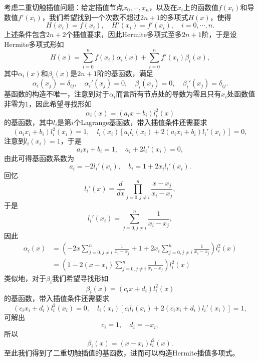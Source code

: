 \documentclass[a4paper,10pt]{ctexart}
\begin{document}
\begin{example}
    考虑二重切触插值问题：给定插值节点$ x_0,\cdots ,x_n $，以及在$ x_i $上的函数值$ f(x_i) $和导数值$ f'(x_i) $，我们希望找到一个次数不超过$ 2n+1 $的多项式$ H(x) $，使得
    \[
        H(x_i)=f(x_i),\quad H'(x_i)=f'(x_i),\quad i=0,\cdots ,n.
    \]
    上述条件包含$ 2n+2 $个插值要求，因此Hermite多项式至多$ 2n+1 $阶，于是设Hermite多项式形如
    \begin{equation}
        H(x)=\sum_{i=0}^{n}f(x_i)\alpha_i(x)+\sum_{i=0}^{n}f'(x_i)\beta_i(x),
    \end{equation}
    其中$ \alpha_i(x) $和$ \beta_i(x) $是$ 2n+1 $阶的基函数，满足
    \[
        \alpha_i(x_j)=\delta_{ij},\quad \alpha_i'(x_j)=0,\quad \beta_i(x_j)=0,\quad \beta_i'(x_j)=\delta_{ij}.
    \]
    基函数的构造不唯一，注意到对于$ \alpha_i $而言所有节点处的导数为零且只有$ x_i $处函数值非零为$ 1 $，因此希望寻找形如
    \begin{equation}
        \alpha_i(x) = (a_ix+b_i)l^2_i(x)
    \end{equation}
    的基函数，其中$ l_i $是第$ i $个Lagrange基函数，带入插值条件还需要求
    \[
        (a_ix_i+b_i)l^2_i(x_i) = 1,\quad l_i(x_i)[a_il_i(x_i)+2(a_ix_i+b_i)l_i'(x_i)] = 0,
    \]
    注意到$ l_i(x_i)=1 $，于是
    \[
        a_ix_i+b_i = 1,\quad a_i +2 l_i'(x_i) = 0,
    \]
    由此可得基函数系数为
    \begin{equation}
        a_i = -2l_i'(x_i),\quad b_i = 1+2x_il_i'(x_i).
    \end{equation}
    回忆
    \[
        l_i'(x) = \frac{d}{dx} \prod_{j=0,j\neq i}^{n}\frac{x-x_j}{x_i-x_j},
    \]
    于是
    \[
        l_i'(x_i) = \sum_{j=0,j\neq i}^{n}\frac{1}{x_i-x_j},
    \]
    因此
    \begin{equation}
        \begin{aligned}
            \alpha_i(x) 
            &= \left( -2x\sum_{j=0,j\neq i}^{n}\frac{1}{x_i-x_j} + 1+2x_i\sum_{j=0,j\neq i}^{n}\frac{1}{x_i-x_j} \right) l_i^2(x)\\
            &= \left( 1-2(x-x_i)\sum_{j=0,j\neq i}^{n}\frac{1}{x_i-x_j} \right) l_i^2(x)
        \end{aligned}
    \end{equation}
    类似地，对于$ \beta_i $我们希望寻找形如
    \begin{equation}
        \beta_i(x) = (c_ix+d_i)l^2_i(x)
    \end{equation}
    的基函数，带入插值条件还需要求
    \[
        (c_ix_i+d_i)l^2_i(x_i) = 0,\quad l_i(x_i)[c_il_i(x_i)+2(c_ix_i+d_i)l_i'(x_i)] = 1,  
    \]
    可解出
    \[
        c_i = 1,\quad d_i = -x_i,
    \]
    所以
    \begin{equation}
        \beta_i(x) = (x-x_i)l^2_i(x).
    \end{equation}
    至此我们得到了二重切触插值的基函数，进而可以构造Hermite插值多项式。
\end{example}
\end{document}
